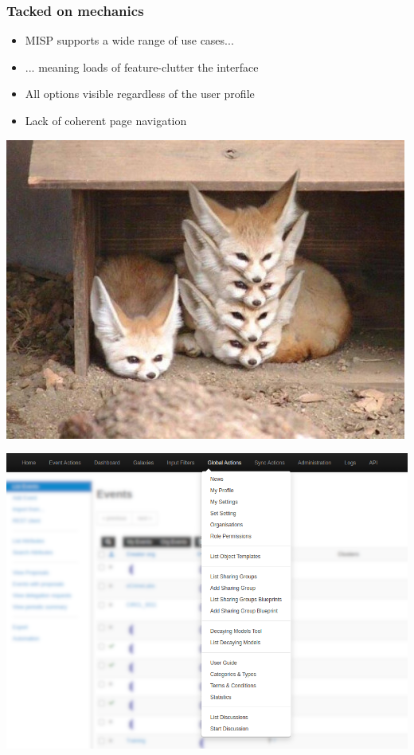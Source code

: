 \begin{frame}[fragile]
    \frametitle{Tacked on mechanics}
    \vspace{1em}
    \begin{minipage}{0.7\textwidth}
        \begin{itemize}
            \item MISP supports a wide range of use cases...
            \item ... meaning loads of feature-clutter the interface
            \item All options visible regardless of the user profile
            \item Lack of coherent page navigation
        \end{itemize}
    \end{minipage}%
    \begin{minipage}{0.3\textwidth}
        \begin{center}
            \;\;\includegraphics[width=0.8\linewidth]{pictures/fennec-stack.png}
        \end{center}
    \end{minipage}
    \begin{center}
        \includegraphics[width=0.55\linewidth]{pictures/confusing-navigation.png}
    \end{center}
\end{frame}

